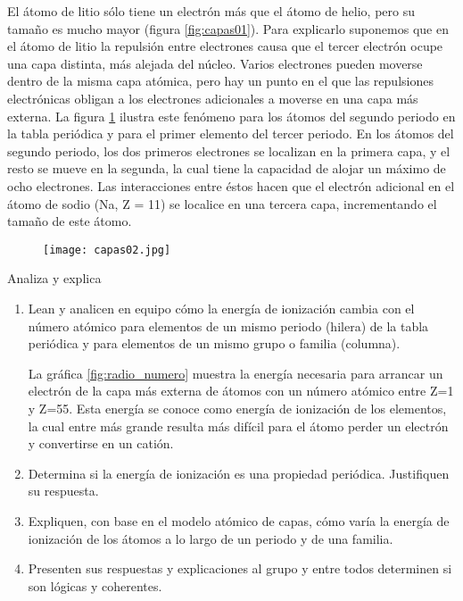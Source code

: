 El átomo de litio sólo tiene un electrón más que el átomo de helio, pero su tamaño es mucho mayor (figura \ref{fig:capas01}).
Para explicarlo suponemos que en el átomo de litio la repulsión entre electrones causa que el tercer electrón ocupe una capa
distinta, más alejada del núcleo. Varios electrones pueden moverse dentro de la misma capa atómica, pero hay un punto en
el que las repulsiones electrónicas obligan a los electrones adicionales a moverse en una capa más externa.
La figura \ref{fig:capas02} ilustra este fenómeno para los átomos del segundo periodo en la tabla periódica y
para el primer elemento del tercer periodo. En los átomos del segundo periodo, los dos primeros electrones se
localizan en la primera capa, y el resto se mueve en la segunda, la cual tiene la capacidad de alojar un máximo
de ocho electrones. Las interacciones entre éstos hacen que el electrón adicional en el átomo de sodio (Na, Z = 11)
se localice en una tercera capa, incrementando el tamaño de este átomo.

\begin{figure}[H]
    \centering
    \texttt{[image: capas02.jpg]}
    \label{fig:capas02}
\end{figure}%

\begin{boxK}
    Analiza y explica
    \begin{enumerate}
        \item Lean y analicen en equipo cómo la energía de ionización cambia con el número atómico para elementos de un
              mismo periodo (hilera) de la tabla periódica y para elementos de un mismo grupo o familia (columna).

              \begin{boxF}
                  La gráfica \ref{fig:radio_numero} muestra la energía necesaria para arrancar un electrón de la capa más
                  externa de átomos
                  con un número atómico entre Z=1 y Z=55. Esta energía se conoce como energía de ionización de los
                  elementos, la cual entre más grande resulta más difícil para el átomo perder un electrón y convertirse en un catión.
              \end{boxF}

        \item Determina si la energía de ionización es una propiedad periódica. Justifiquen su respuesta.
        \item Expliquen, con base en el modelo atómico de capas, cómo varía la energía de ionización de los átomos a
              lo largo de un periodo y de una familia.
        \item Presenten sus respuestas y explicaciones al grupo y entre todos determinen si son lógicas y coherentes.
    \end{enumerate}
\end{boxK}
\newpage
